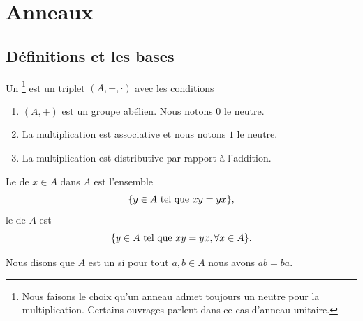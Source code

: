 
\section{Anneaux}
\subsection{Définitions et les bases}

\begin{definition}     \label{DefHXJUooKoovob}
    Un \footnote{Nous faisons le choix qu'un anneau admet toujours un neutre pour la multiplication. Certains ouvrages parlent dans ce cas d'anneau unitaire.} est un triplet \( (A,+,\cdot)\) avec les conditions
    \begin{enumerate}
        \item
            \( (A,+)\) est un groupe abélien. Nous notons \( 0\) le neutre.
        \item
            La multiplication est associative et nous notons \( 1\) le neutre.
        \item
            La multiplication est distributive par rapport à l'addition.
    \end{enumerate}
\end{definition}

\begin{definition}
    Le  de \( x\in A\) dans \( A\) est l'ensemble
    \begin{equation}
        \{ y\in A\text{ tel que } xy=yx \},
    \end{equation}
    le  de \( A\) est
    \begin{equation}
        \{ y\in A\text{ tel que } xy=yx,\forall x\in A \}.
    \end{equation}
\end{definition}

\begin{definition}
    Nous disons que \( A\) est un  si pour tout \( a,b\in A\) nous avons \( ab=ba\).
\end{definition}

